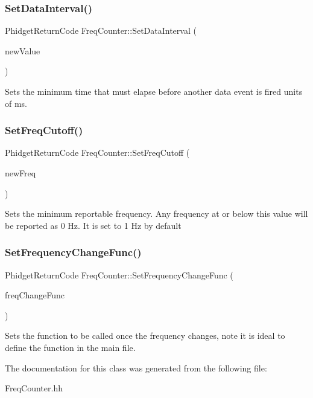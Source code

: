 \subsubsection{\texorpdfstring{Set\+Data\+Interval()}{SetDataInterval()}}
{\footnotesize\ttfamily Phidget\+Return\+Code Freq\+Counter\+::\+Set\+Data\+Interval (\begin{DoxyParamCaption}\item[{uint32\+\_\+t}]{new\+Value }\end{DoxyParamCaption})\hspace{0.3cm}{\ttfamily [inline]}}

Sets the minimum time that must elapse before another data event is fired units of ms.\mbox{\label{classFreqCounter_a6a5957e994246be1f2b9a6dcca125d0e}} 
\subsubsection{\texorpdfstring{Set\+Freq\+Cutoff()}{SetFreqCutoff()}}
{\footnotesize\ttfamily Phidget\+Return\+Code Freq\+Counter\+::\+Set\+Freq\+Cutoff (\begin{DoxyParamCaption}\item[{double}]{new\+Freq }\end{DoxyParamCaption})\hspace{0.3cm}{\ttfamily [inline]}}

Sets the minimum reportable frequency. Any frequency at or below this value will be reported as 0 Hz. It is set to 1 Hz by default\mbox{\label{classFreqCounter_aac2f6e513119aaf984fce1a0100833c9}} 
\subsubsection{\texorpdfstring{Set\+Frequency\+Change\+Func()}{SetFrequencyChangeFunc()}}
{\footnotesize\ttfamily Phidget\+Return\+Code Freq\+Counter\+::\+Set\+Frequency\+Change\+Func (\begin{DoxyParamCaption}\item[{Phidget\+Frequency\+Counter\+\_\+\+On\+Frequency\+Change\+Callback}]{freq\+Change\+Func }\end{DoxyParamCaption})\hspace{0.3cm}{\ttfamily [inline]}}

Sets the function to be called once the frequency changes, note it is ideal to define the function in the main file.

The documentation for this class was generated from the following file\+:\begin{DoxyCompactItemize}
\item 
Freq\+Counter.\+hh\end{DoxyCompactItemize}
